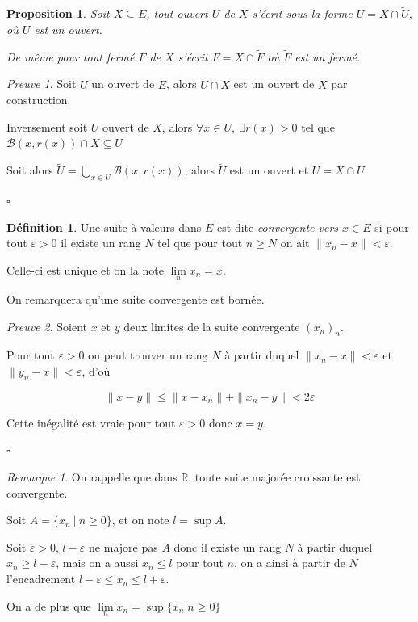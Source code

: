 \documentclass[]{article}
\newtheorem{myproposition}{Proposition}
\theoremstyle{remark}
\newtheorem{myrem}{Remarque}
\newtheorem{myproof}{Preuve}
\theoremstyle{definition}
\newtheorem{mydef}{Définition}
\newcommand{\cqfd}{
	\hfill$\square$
}
\begin{document}
\begin{myproposition}
	Soit $X \subseteq E$, tout ouvert $U$ de $X$ s'écrit sous la forme $U=X \cap \widetilde{U}$, où $\widetilde{U}$ est un ouvert.
	
	De même pour tout fermé $F$ de $X$ s'écrit $F=X \cap \widetilde{F}$ où $\widetilde{F}$ est un fermé.
\end{myproposition}

\begin{myproof}
	Soit $\widetilde{U}$ un ouvert de $E$, alors $\widetilde{U} \cap X$ est un ouvert de $X$ par construction.
	
	Inversement soit $U$ ouvert de $X$, alors $\forall x \in U, ~ \exists r(x) > 0$ tel que $\mathcal{B}(x, r(x)) \cap X \subseteq U$
	
	Soit alors $\displaystyle \widetilde{U} = \bigcup_{x \in U} \mathcal{B}(x, r(x))$, alors $\widetilde{U}$ est un ouvert et $U = X \cap U$
	\cqfd
\end{myproof}

\begin{mydef}
	Une suite à valeurs dans $E$ est dite \textit{convergente vers $x \in E$} si pour tout $\varepsilon > 0$ il existe un rang $N$ tel que pour tout $n \geqslant N$ on ait $\|x_n-x\| < \varepsilon$.
	
	Celle-ci est unique et on la note $\lim\limits_{n} x_n = x$.
\end{mydef}

On remarquera qu'une suite convergente est bornée.

\begin{myproof}
	Soient $x$ et $y$ deux limites de la suite convergente $(x_n)_n$.
	
	Pour tout $\varepsilon > 0$ on peut trouver un rang $N$ à partir duquel $\|x_n-x\|<\varepsilon$ et $\|y_n-x\|<\varepsilon$, d'où
	
	$$\|x-y\| \leqslant \|x-x_n\| + \|x_n-y\| < 2\varepsilon$$
	
	Cette inégalité est vraie pour tout $\varepsilon>0$ donc $x=y$.
	
	\cqfd
\end{myproof}

\begin{myrem}
	On rappelle que dans $\mathbb{R}$, toute suite majorée croissante est convergente.
	
	Soit $A=\{x_n ~ | ~ n \geqslant 0\}$, et on note $l = \sup A$.
	
	Soit $\varepsilon > 0$, $l - \varepsilon$ ne majore pas $A$ donc il existe un rang $N$ à partir duquel $x_n \geqslant l-\varepsilon$, mais on a aussi $x_n \leqslant l$ pour tout $n$, on a ainsi à partir de $N$ l'encadrement $l - \varepsilon \leqslant x_n \leqslant l + \varepsilon$.
	
	On a de plus que $\lim\limits_{n} x_n = \sup \{x_n | n \geqslant 0\}$
\end{myrem}
\end{document}
